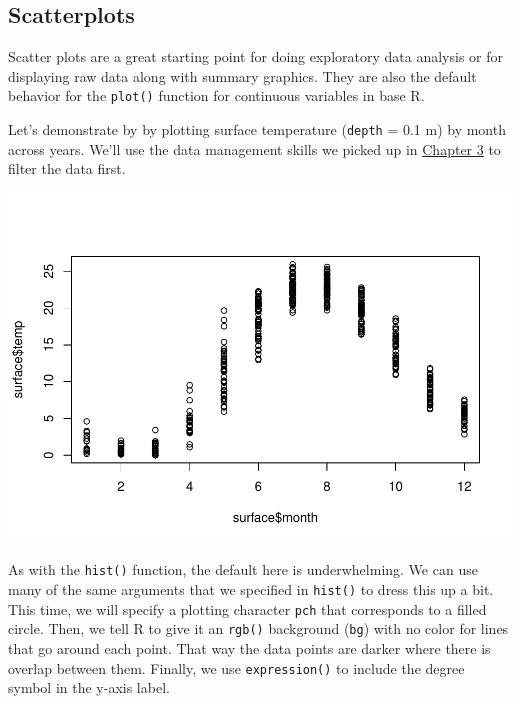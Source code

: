 \documentclass[
]{book}
\newenvironment{Shaded}{\begin{snugshade}}{\end{snugshade}}
\newcommand{\CommentTok}[1]{\textcolor[rgb]{0.56,0.35,0.01}{\textit{#1}}}
\newcommand{\DataTypeTok}[1]{\textcolor[rgb]{0.13,0.29,0.53}{#1}}
\newcommand{\FloatTok}[1]{\textcolor[rgb]{0.00,0.00,0.81}{#1}}
\newcommand{\KeywordTok}[1]{\textcolor[rgb]{0.13,0.29,0.53}{\textbf{#1}}}
\newcommand{\NormalTok}[1]{#1}
\newcommand{\OperatorTok}[1]{\textcolor[rgb]{0.81,0.36,0.00}{\textbf{#1}}}
\newcommand{\StringTok}[1]{\textcolor[rgb]{0.31,0.60,0.02}{#1}}
\begin{document}
\hypertarget{scatterplots}{%
\subsection{Scatterplots}\label{scatterplots}}

Scatter plots are a great starting point for doing exploratory data analysis or for displaying raw data along with summary graphics. They are also the default behavior for the \texttt{plot()} function for continuous variables in base R.

Let's demonstrate by by plotting surface temperature (\texttt{depth} = 0.1 m) by month across years. We'll use the data management skills we picked up in \protect\hyperlink{Chapterux5cux25203}{Chapter 3} to filter the data first.

\begin{Shaded}
\end{Shaded}

\includegraphics{worstr_files/figure-latex/unnamed-chunk-92-1.pdf}

As with the \texttt{hist()} function, the default here is underwhelming. We can use many of the same arguments that we specified in \texttt{hist()} to dress this up a bit. This time, we will specify a plotting character \texttt{pch} that corresponds to a filled circle. Then, we tell R to give it an \texttt{rgb()} background (\texttt{bg}) with no color for lines that go around each point. That way the data points are darker where there is overlap between them. Finally, we use \texttt{expression()} to include the degree symbol in the y-axis label.
\end{document}
